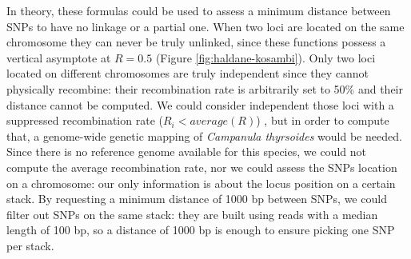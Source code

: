 \documentclass[a4paper, 12pt]{report}
\begin{document}
\begin{itemize}
	In theory, these formulas could be used to assess a minimum distance between SNPs to have no linkage or a partial one. When two loci are located on the same chromosome they can never be truly unlinked, since these functions possess a vertical asymptote at $R = 0.5$ (Figure \ref{fig:haldane-kosambi}).
	 Only two loci located on different chromosomes are truly independent since they cannot physically recombine: their recombination rate is arbitrarily set to 50\% and their distance cannot be computed. We could consider independent those loci with a suppressed recombination rate ($R_i < average(R)$) \parencite{semagnPrinciplesRequirementsProspects}, but in order to compute that, a genome-wide genetic mapping of \textit{Campanula thyrsoides} would be needed. Since there is no reference genome available for this species, we could not compute the average recombination rate, nor we could assess the SNPs location on a chromosome: our only information is about the locus position on a certain stack. By requesting a minimum distance of 1000 bp between SNPs, we could filter out SNPs on the same stack: they are built using reads with a median length of 100 bp, so a distance of 1000 bp is enough to ensure picking one SNP per stack.
	 

\end{itemize}
\end{document}
